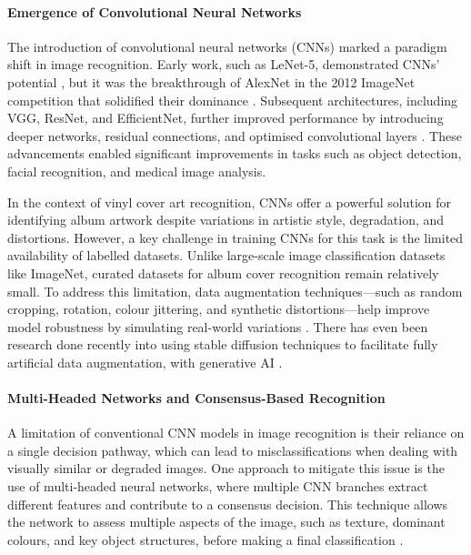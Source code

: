            \paragraph{Emergence of Convolutional Neural Networks}
            
                The introduction of convolutional neural networks (CNNs) marked a paradigm shift in image recognition. Early work, such as LeNet-5, demonstrated CNNs' potential \cite{726791}, but it was the breakthrough of AlexNet in the 2012 ImageNet competition that solidified their dominance \cite{imagenetclasscnn}. Subsequent architectures, including VGG, ResNet, and EfficientNet, further improved performance by introducing deeper networks, residual connections, and optimised convolutional layers \cite{deppcnnsforimagerecognition}. These advancements enabled significant improvements in tasks such as object detection, facial recognition, and medical image analysis.
    
                In the context of vinyl cover art recognition, CNNs offer a powerful solution for identifying album artwork despite variations in artistic style, degradation, and distortions. However, a key challenge in training CNNs for this task is the limited availability of labelled datasets. Unlike large-scale image classification datasets like ImageNet, curated datasets for album cover recognition remain relatively small. To address this limitation, data augmentation techniques—such as random cropping, rotation, colour jittering, and synthetic distortions—help improve model robustness by simulating real-world variations \cite{LIN2025102660}. There has even been research done recently into using stable diffusion techniques to facilitate fully artificial data augmentation, with generative AI \cite{Alimisis2025}.
    
            \paragraph{Multi-Headed Networks and Consensus-Based Recognition}
    
                A limitation of conventional CNN models in image recognition is their reliance on a single decision pathway, which can lead to misclassifications when dealing with visually similar or degraded images. One approach to mitigate this issue is the use of multi-headed neural networks, where multiple CNN branches extract different features and contribute to a consensus decision. This technique allows the network to assess multiple aspects of the image, such as texture, dominant colours, and key object structures, before making a final classification \cite{Zheng2017}. 
            
